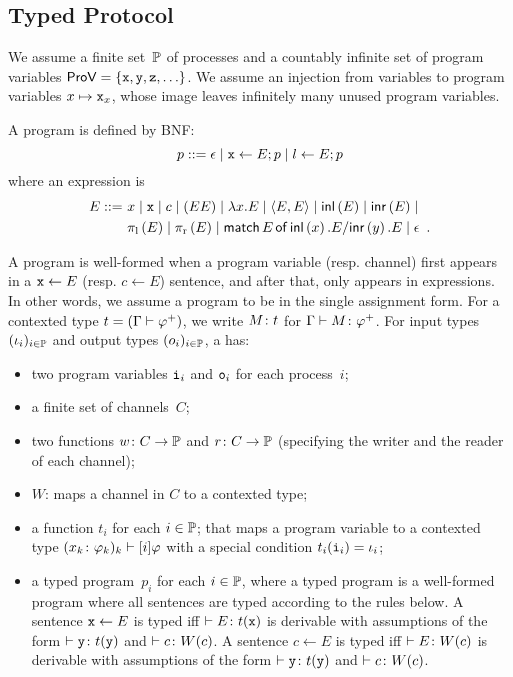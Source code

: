 {\subsection{Typed Protocol}

We assume a finite set~$\mathbb{P}$
of processes and a countably infinite
set of program variables $\mathsf{ProV} =\{\texttt{x}, \texttt{y}, \texttt{z}, \ldots\}$.
We assume an injection from variables to program variables $x\mapsto
\texttt{x}_x$, whose image leaves infinitely many unused program variables.

A program is defined by BNF:
\[
 p ::= \epsilon\mid
 \texttt{x}\leftarrow E; p \mid
 l \leftarrow E; p
\]
where an expression is
\begin{align*}
 E
 ::=\,\,
 &x\mid \texttt{x} \mid c \mid (EE)\mid \lambda
 x.E\mid \langle{E,E}\rangle\mid \mathsf{inl}\left({E}\right)\mid \mathsf{inr}\left({E}\right)\mid \\
 &\pi_{\mathrm l}\left({E}\right)\mid\pi_{\mathrm r}\left({E}\right)\mid  \mathsf{match}\,{E}\,\mathsf{of}\, \mathsf{inl}\left({x}\right). {E}/ \mathsf{inr}\left({y}\right). {E}\mid \epsilon\enspace.
\end{align*}

\newcommand{\Wg}{W_{\mathrm g}}
\newcommand{\Wd}{W_{\mathrm d}}
A program is well-formed when
a program variable (resp. channel) first appears in a $\texttt{x}\leftarrow E$
(resp. $c\leftarrow E$)
sentence, and
after that, only appears in expressions.
In other words, we assume a program to be in the single assignment form.
For a contexted type $t = (\Gamma\vdash{\varphi}^+)$,
we write ${M} \colon{t}$ for
$\Gamma\vdash{M} \colon{{\varphi}^+}$.
For input types $(\iota_i)_{i\in\mathbb{P}}$
and output types $(o_i)_{i\in\mathbb{P}}$,
a  has:
\begin{itemize}
 \item two program variables
      $\texttt{i}_i$ and $\texttt{o}_i$ for each process~$i$;
 \item a finite set of channels~$C$;
 \item two functions $w\colon C\rightarrow \mathbb{P}$
       and $r\colon C\rightarrow
       \mathbb{P}$ (specifying the writer and the reader of
       each channel);
 \item $W$: maps a channel in $C$ to a contexted type;
 \item a function $t_i$ for each $i\in \mathbb{P}$;
       that maps a program variable to a contexted type
       $({x_k} \colon{\varphi_k})_k \vdash[i]\varphi$ with a special condition
       $t_i(\texttt{i}_i)= \iota_i$;
 \item a typed program~$p_i$ for each $i\in \mathbb{P}$,
       where
       a typed program is a well-formed program where all
       sentences are typed according to the rules below.
       A sentence $\texttt{x} \leftarrow E$ is typed  iff $\vdash E\colon t(\texttt{x})$ is derivable with
       assumptions of the form $\vdash{\texttt{y}} \colon{t(\texttt{y})}$ and $\vdash{c} \colon{W(c)}$.
       A sentence $c\leftarrow E$ is typed iff
       $\vdash{E} \colon{W(c)}$ is derivable
       with
       assumptions of the form $\vdash{\texttt{y}} \colon{t(\texttt{y})}$ and $\vdash{c} \colon{W(c)}$.
\end{itemize}

}
